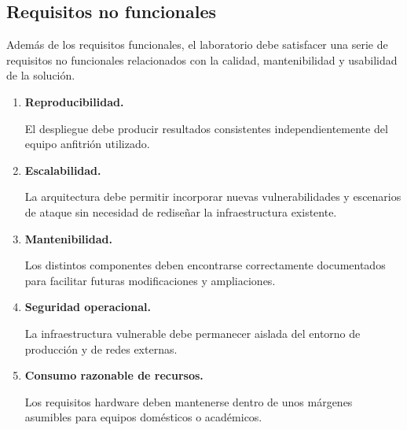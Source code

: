 


\subsection{Requisitos no funcionales}

Además de los requisitos funcionales, el laboratorio debe satisfacer una serie de requisitos no funcionales relacionados con la calidad, mantenibilidad y usabilidad de la solución.

\begin{enumerate}

\item \textbf{Reproducibilidad.}

El despliegue debe producir resultados consistentes independientemente del equipo anfitrión utilizado.

\item \textbf{Escalabilidad.}

La arquitectura debe permitir incorporar nuevas vulnerabilidades y escenarios de ataque sin necesidad de rediseñar la infraestructura existente.

\item \textbf{Mantenibilidad.}

Los distintos componentes deben encontrarse correctamente documentados para facilitar futuras modificaciones y ampliaciones.

\item \textbf{Seguridad operacional.}

La infraestructura vulnerable debe permanecer aislada del entorno de producción y de redes externas.

\item \textbf{Consumo razonable de recursos.}

Los requisitos hardware deben mantenerse dentro de unos márgenes asumibles para equipos domésticos o académicos.

\end{enumerate}

\vspace{0.5cm}
\renewcommand{\arraystretch}{1.5}

